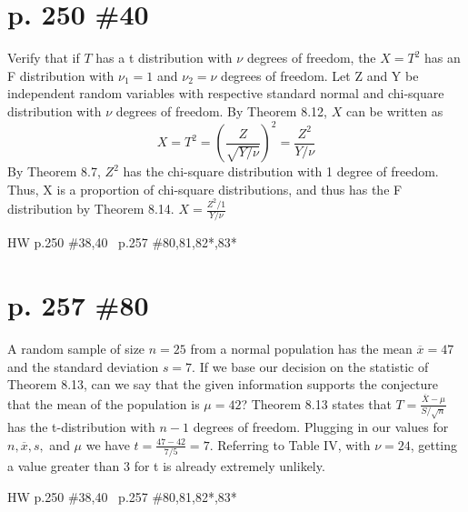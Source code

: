 \documentclass[12pt]{article}
\begin{document}
	\section[20pt]{p. 250 \#40}
	Verify that if \(T\) has a t distribution with \(\nu\) degrees of freedom, the \(X=T^2\) has an F distribution with \(\nu_1 = 1\) and \(\nu_2=\nu\) degrees of freedom. \newline \newline
	Let Z and Y be independent random variables with respective standard normal and chi-square distribution with \(\nu\) degrees of freedom.
	By Theorem 8.12, \(X\) can be written as
	\[X=T^2=\left(\frac{Z}{\sqrt{Y/\nu}}\right)^2=\frac{Z^2}{Y/\nu}\]
	By Theorem 8.7, \(Z^2\) has the chi-square distribution with 1 degree of freedom. \newline
	Thus, X is a proportion of chi-square distributions, and thus has the F distribution by Theorem 8.14. \newline
	\(X=\frac{Z^2/1}{Y/\nu}\) \newline
	\newline \newpage
	\maketitle HW p.250 \#38,40 \ p.257 \#80,81,82*,83*
	\section[20pt]{p. 257 \#80}
	A random sample of size \(n=25\) from a normal population has the mean \(\overline{x}=47\) and the standard deviation \(s=7\). If we base our decision on the statistic of Theorem 8.13, can we say that the given information supports the conjecture that the mean of the population is \(\mu=42\)? \newline \newline
	Theorem 8.13 states that \(T=\frac{\overline{X}-\mu}{S/\sqrt{n}}\) has the t-distribution with \(n-1\) degrees of freedom. \newline
	Plugging in our values for \(n,\overline{x},s,\) and \(\mu\) we have
	\(t=\frac{47-42}{7/5}=7\). \newline
	\newline
	Referring to Table IV, with \(\nu = 24\), getting a value greater than 3 for t is already extremely unlikely. \newline
	\newline \newpage
	\maketitle HW p.250 \#38,40 \ p.257 \#80,81,82*,83*
\end{document}
